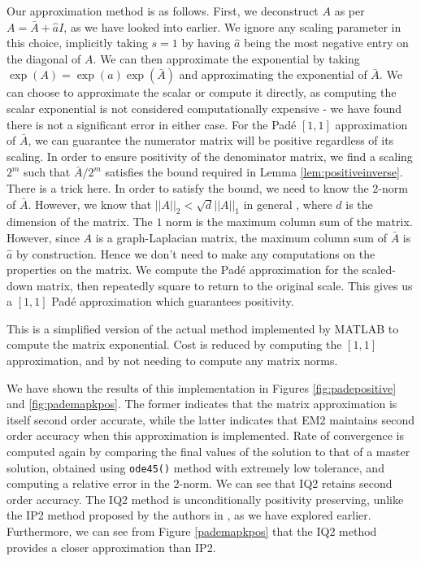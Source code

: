 Our approximation method is as follows.
First, we deconstruct $A$ as per $A = \bar{A} + \hat{a}I$, as we have looked into earlier.
We ignore any scaling parameter in this choice, implicitly taking $s=1$ by having $\hat{a}$ being the most negative entry on the diagonal of $A$.
We can then approximate the exponential by taking $\exp(A) = \exp(a)\exp(\bar{A})$ and approximating the exponential of $\bar{A}$.
We can choose to approximate the scalar or compute it directly, as computing the scalar exponential is not considered computationally expensive - we have found there is not a significant error in either case.
For the Pad\'e $[1,1]$ approximation of $\bar{A}$, we can guarantee the numerator matrix will be positive regardless of its scaling.
In order to ensure positivity of the denominator matrix, we find a scaling $2^m$ such that $\bar{A}/2^m$ satisfies the bound required in Lemma \ref{lem:positiveinverse}.
There is a trick here. In order to satisfy the bound, we need to know the $2$-norm of $\bar{A}$.
However, we know that $||A||_2 < \sqrt{d}||A||_1$ in general \cite{horn2012matrix}, where $d$ is the dimension of the matrix.
The $1$ norm is the maximum column sum of the matrix. However, since $A$ is a graph-Laplacian matrix, the maximum column sum of $\bar{A}$ is $\hat{a}$ by construction.
Hence we don't need to make any computations on the properties on the matrix.
We compute the Pad\'e approximation for the scaled-down matrix, then repeatedly square to return to the original scale.
This gives us a $[1,1]$ Pad\'e approximation which guarantees positivity.

This is a simplified version of the actual method implemented by MATLAB to compute the matrix exponential.
Cost is reduced by computing the $[1,1]$ approximation,
and by not needing to compute any matrix norms.

We have shown the results of this implementation in Figures \ref{fig:padepositive} and \ref{fig:pademapkpos}.
The former indicates that the matrix approximation is itself second order accurate,
while the latter indicates that EM2 maintains second order accuracy when this approximation is implemented.
Rate of convergence is computed again by comparing the final values of the solution to that of a master solution, obtained using \texttt{ode45()} method with extremely low tolerance,
and computing a relative error in the $2$-norm.
We can see that IQ2 retains second order accuracy.
The IQ2 method is unconditionally positivity preserving, unlike the IP2 method proposed by the authors in \cite{blanes_pos_2022}, as we have explored earlier.
Furthermore, we can see from Figure \ref{pademapkpos} that the IQ2 method provides a closer approximation than IP2.

